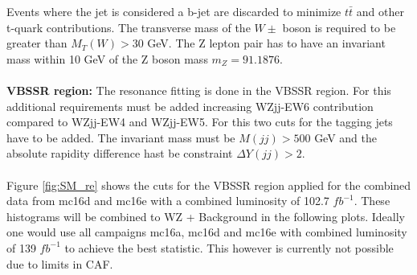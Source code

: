 \documentclass[../Bachelorarbeit.tex]{subfiles}
\begin{document}
Events where the jet is considered a b-jet are discarded to minimize $t\bar{t}$ and other t-quark contributions.
The transverse mass of the $W{\pm}$ boson is required to be greater than $M_{T}(W)>30$ GeV.
The Z lepton pair has to have an invariant mass within 10 GeV of the Z boson mass $m_{Z}=91.1876$.
\\\\
\textbf{VBSSR region:} The resonance fitting is done in the VBSSR region. For this additional requirements must be added
increasing WZjj-EW6 contribution compared to WZjj-EW4 and WZjj-EW5. For this two cuts for the tagging jets have to be added. The invariant mass must be
$M(jj)>500$ GeV and the absolute rapidity difference hast be constraint $\Delta Y(jj) >2$.
\\\\
Figure \ref{fig:SM_re} shows the cuts for the VBSSR region applied for the combined data from mc16d and mc16e with a combined luminosity of 102.7 $fb^{-1}$.
These histograms will be combined to WZ + Background in the following plots.
Ideally one would use all campaigns mc16a, mc16d and mc16e with combined luminosity of 139 $fb^{-1}$ to achieve the best statistic.
This however is currently not possible due to limits in CAF.
\end{document}
